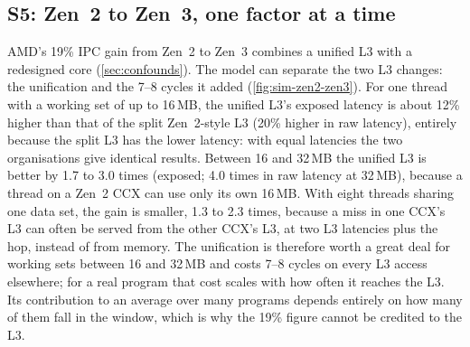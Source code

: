 \subsection{S5: Zen~2 to Zen~3, one factor at a time}
\label{sec:sim-zen2-zen3}
AMD's 19\% IPC gain from Zen~2 to Zen~3 combines a unified L3 with a redesigned core (\cref{sec:confounds}). The model can separate the two L3 changes: the unification and the 7--8 cycles it added (\cref{fig:sim-zen2-zen3}). For one thread with a working set of up to 16\,MB, the unified L3's exposed latency is about 12\% higher than that of the split Zen~2-style L3 (20\% higher in raw latency), entirely because the split L3 has the lower latency: with equal latencies the two organisations give identical results. Between 16 and 32\,MB the unified L3 is better by 1.7 to 3.0 times (exposed; 4.0 times in raw latency at 32\,MB), because a thread on a Zen~2 CCX can use only its own 16\,MB. With eight threads sharing one data set, the gain is smaller, 1.3 to 2.3 times, because a miss in one CCX's L3 can often be served from the other CCX's L3, at two L3 latencies plus the hop, instead of from memory. The unification is therefore worth a great deal for working sets between 16 and 32\,MB and costs 7--8 cycles on every L3 access elsewhere; for a real program that cost scales with how often it reaches the L3. Its contribution to an average over many programs depends entirely on how many of them fall in the window, which is why the 19\% figure cannot be credited to the L3.

